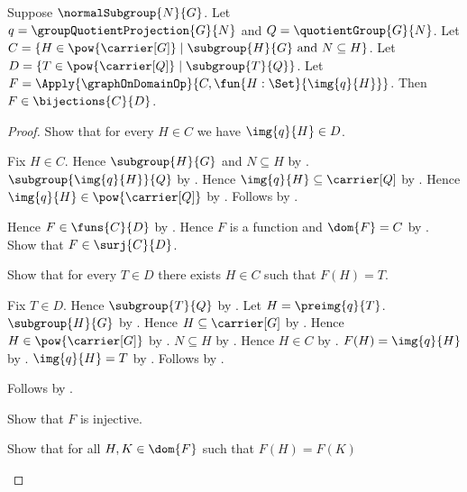 \begin{theorem}\label{group_subgroup_correspondence_bijection}
    Suppose $\normalSubgroup{N}{G}$.
    Let $q=\groupQuotientProjection{G}{N}$ and
        $Q=\quotientGroup{G}{N}$.
    Let
        $C=\{H\in\pow{\carrier[G]}\mid
            \text{$\subgroup{H}{G}$ and $N\subseteq H$}\}$.
    Let
        $D=\{T\in\pow{\carrier[Q]}\mid
            \text{$\subgroup{T}{Q}$}\}$.
    Let
        $F=\Apply{\graphOnDomainOp}{
            C,\fun{H:\Set}{\img{q}{H}}}$.
    Then $F\in\bijections{C}{D}$.
\end{theorem}
\begin{proof}
    Show that for every $H\in C$ we have $\img{q}{H}\in D$.
    \begin{subproof}
        Fix $H\in C$.
        Hence $\subgroup{H}{G}$ and $N\subseteq H$ by \auto.
        $\subgroup{\img{q}{H}}{Q}$ by
            .
        Hence $\img{q}{H}\subseteq\carrier[Q]$ by
            .
        Hence $\img{q}{H}\in\pow{\carrier[Q]}$ by
            .
        Follows by \auto.
    \end{subproof}
    Hence $F\in\funs{C}{D}$ by
        .
    Hence $F$ is a function and $\dom{F}=C$ by .
    Show that $F\in\surj{C}{D}$.
    \begin{subproof}
        Show that for every $T\in D$ there exists $H\in C$ such that
            $F(H)=T$.
        \begin{subproof}
            Fix $T\in D$.
            Hence $\subgroup{T}{Q}$ by \auto.
            Let $H=\preimg{q}{T}$.
            $\subgroup{H}{G}$ by
                .
            Hence $H\subseteq\carrier[G]$ by .
            Hence $H\in\pow{\carrier[G]}$ by .
            $N\subseteq H$ by
                .
            Hence $H\in C$ by \auto.
            $F(H)=\img{q}{H}$ by
                .
            $\img{q}{H}=T$ by
                .
            Follows by \auto.
        \end{subproof}
        Follows by .
    \end{subproof}
    Show that $F$ is injective.
    \begin{subproof}
        Show that for all $H,K\in\dom{F}$ such that $F(H)=F(K)$

\end{subproof}
\end{proof}
